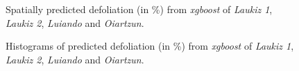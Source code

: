 \documentclass[review]{elsarticle}
\begin{document}
\begin{figure} [b!]
	\begin{center}
		\caption{Spatially predicted defoliation (in \%) from \textit{xgboost} of \textit{Laukiz 1}, \textit{Laukiz 2}, \textit{Luiando} and \textit{Oiartzun}.}
		\label{fig:pred_demon_plots}
	\end{center}
\end{figure}

\begin{figure} [t!]
	\begin{center}
		\caption{Histograms of predicted defoliation (in \%) from \textit{xgboost} of \textit{Laukiz 1}, \textit{Laukiz 2}, \textit{Luiando} and \textit{Oiartzun}.}
		\label{fig:pred_demon_plots_hists}
	\end{center}
\end{figure}
\end{document}
